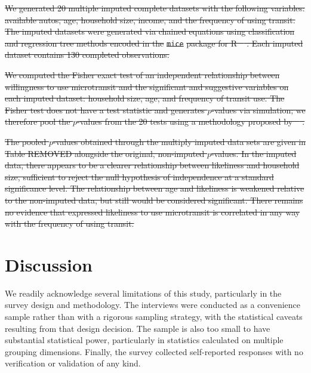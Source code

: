 \documentclass[smartcities,article,submit,moreauthors,pdftex]{Definitions/mdpi}
\providecommand{\DIFdel}[1]{{\protect\color{red}\sout{#1}}}                      %
\providecommand{\DIFdelend}{} %
\begin{document}
\DIFdel{We generated 20 multiple imputed complete datasets with the following variables: available autos, age, household size, income, and the frequency of using transit. The imputed datasets were generated via chained equations using classification and regression tree methods encoded in the }\texttt{\DIFdel{mice}} %
\DIFdel{package for R \mbox{%
\citep{mice2011, R-base}}\hspace{0pt}%
. Each imputed dataset contains 130 completed observations.
}%

\DIFdel{We computed the Fisher exact test of an independent relationship between willingness to use microtransit and the significant and suggestive variables on each imputed dataset: household size, age, and frequency of transit use. The Fisher test does not have a test statistic and generates \(p\)-values via simulation; we therefore pool the \(p\)-values from the 20 tests using a methodology proposed by \mbox{%
\citet{LichtThesis}}\hspace{0pt}%
.
}%

\DIFdel{The pooled \(p\)-values obtained through the multiply imputed data sets are given in Table REMOVED alongside the original, non-imputed \(p\)-values. In the imputed data, there appears to be a clearer relationship between likeliness and household size, sufficient to reject the null hypothesis of independence at a standard significance level. The relationship between age and likeliness is weakened relative to the non-imputed data, but still would be considered significant. There remains no evidence that expressed likeliness to use microtransit is correlated in any way with the frequency of using transit.
}%

\DIFdelend %
\section{Discussion}
We readily acknowledge several limitations of this study, particularly in the survey design and methodology. The interviews were conducted as a convenience sample rather than with a rigorous sampling strategy, with the statistical caveats resulting from that design decision. The sample is also too small to have substantial statistical power, particularly in statistics calculated on multiple grouping dimensions. Finally, the survey collected self-reported responses with no verification or validation of any kind.
\end{document}
